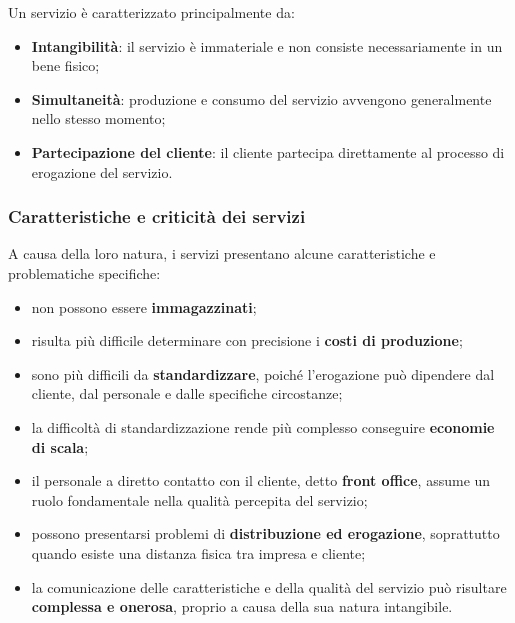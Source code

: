 \medskip

\noindent Un servizio è caratterizzato principalmente da:

\begin{itemize}
    \item \textbf{Intangibilità}: il servizio è immateriale e non consiste necessariamente in un bene fisico;
    
    \item \textbf{Simultaneità}: produzione e consumo del servizio avvengono generalmente nello stesso momento;
    
    \item \textbf{Partecipazione del cliente}: il cliente partecipa direttamente al processo di erogazione del servizio.
\end{itemize}

\subsubsection*{Caratteristiche e criticità dei servizi}

\noindent A causa della loro natura, i servizi presentano alcune caratteristiche e problematiche specifiche:

\begin{itemize}
    \item non possono essere \textbf{immagazzinati};
    
    \item risulta più difficile determinare con precisione i \textbf{costi di produzione};
    
    \item sono più difficili da \textbf{standardizzare}, poiché l'erogazione può dipendere dal cliente, dal personale e dalle specifiche circostanze;
    
    \item la difficoltà di standardizzazione rende più complesso conseguire \textbf{economie di scala};
    
    \item il personale a diretto contatto con il cliente, detto \textbf{front office}, assume un ruolo fondamentale nella qualità percepita del servizio;
    
    \item possono presentarsi problemi di \textbf{distribuzione ed erogazione}, soprattutto quando esiste una distanza fisica tra impresa e cliente;
    
    \item la comunicazione delle caratteristiche e della qualità del servizio può risultare \textbf{complessa e onerosa}, proprio a causa della sua natura intangibile.
\end{itemize}

